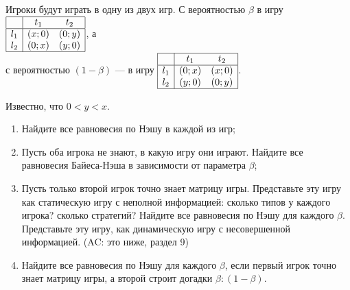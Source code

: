 \begin{problem}\par
\begin{source}\cite{polisci:lectures} \end{source}
Игроки будут играть в одну из двух игр.
С вероятностью  $\beta $ в игру  $\begin{array}{|c|cc|}  \hline {} & {t_{1} } & {t_{2} } \\  \hline {l_{1} } & {\left(x;0\right)} & {\left(0;y\right)} \\ {l_{2} } & {\left(0;x\right)} & {\left(y;0\right)} \\  \hline  \end{array}$, а  \\
с вероятностью  $\left(1-\beta \right)$  --- в игру  $\begin{array}{|c|cc|}  \hline {} & {t_{1} } & {t_{2} } \\  \hline {l_{1} } & {\left(0;x\right)} & {\left(x;0\right)} \\ {l_{2} } & {\left(y;0\right)} & {\left(0;y\right)} \\  \hline  \end{array}$.

Известно, что  $0<y<x$.\par
\begin{enumerate}
\item	Найдите все равновесия по Нэшу в каждой из игр;\par
\item 	Пусть оба игрока не знают, в какую игру они играют. Найдите все равновесия Байеса-Нэша в зависимости от параметра  $\beta$;\par
\item 	Пусть только второй игрок точно знает матрицу игры. Представьте эту игру как статическую игру с неполной информацией: сколько типов у каждого игрока? сколько стратегий? Найдите все равновесия по Нэшу для каждого  $\beta $. Представьте эту игру, как динамическую игру с несовершенной информацией. ({\red AC: это ниже, раздел 9})\par
\item	Найдите все равновесия по Нэшу для каждого  $\beta $, если первый игрок точно знает матрицу игры, а второй строит догадки $\beta: (1-\beta)$.\par
\end{enumerate}


\begin{sol}

\end{sol}
\end{problem}



